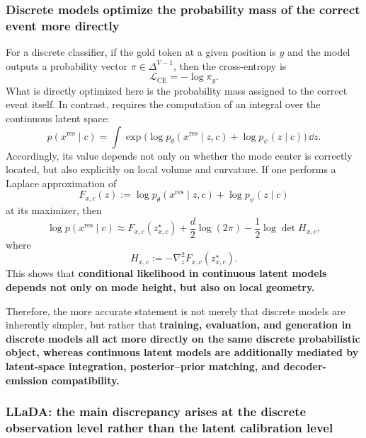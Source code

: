 \subsubsection{Discrete models optimize the probability mass of the correct event more directly}

For a discrete classifier, if the gold token at a given position is $y$ and the model outputs a probability vector $\pi\in\Delta^{V-1}$, then the cross-entropy is
\begin{equation}
\mathcal L_{\mathrm{CE}}=-\log \pi_y.
\label{eq:discrete_ce_appendix}
\end{equation}
What is directly optimized here is the probability mass assigned to the correct event itself. In contrast, \method requires the computation of an integral over the continuous latent space:
\begin{equation}
p(x^{\mathrm{res}}\mid c)
=
\int \exp\!\Big(
\log p_{\theta}(x^{\mathrm{res}}\mid z,c)+\log p_{\psi}(z\mid c)
\Big)\,\dd z.
\label{eq:continuous_integral_appendix}
\end{equation}
Accordingly, its value depends not only on whether the mode center is correctly located, but also explicitly on local volume and curvature. If one performs a Laplace approximation of
\[
F_{x,c}(z):=\log p_{\theta}(x^{\mathrm{res}}\mid z,c)+\log p_{\psi}(z\mid c)
\]
at its maximizer, then
\begin{equation}
\log p(x^{\mathrm{res}}\mid c)
\approx
F_{x,c}(z_{x,c}^{\star})
+\frac{d}{2}\log(2\pi)
-\frac12\log\det H_{x,c},
\label{eq:laplace_appendix}
\end{equation}
where
\[
H_{x,c}:=-\nabla_z^2F_{x,c}(z_{x,c}^{\star}).
\]
This shows that \textbf{conditional likelihood in continuous latent models depends not only on mode height, but also on local geometry.}

Therefore, the more accurate statement is not merely that discrete models are inherently simpler, but rather that \textbf{training, evaluation, and generation in discrete models all act more directly on the same discrete probabilistic object, whereas continuous latent models are additionally mediated by latent-space integration, posterior--prior matching, and decoder-emission compatibility.}

\subsubsection{LLaDA: the main discrepancy arises at the discrete observation level rather than the latent calibration level}

